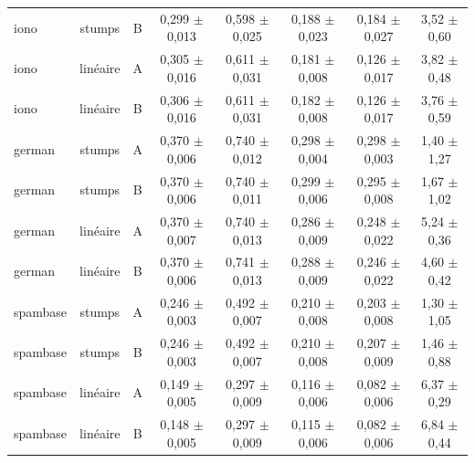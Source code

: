 \begin{table}[tbp]
{\begin{tabular}{lccccccc}
iono & stumps & B & 0,299 $\pm$ 0,013 & 0,598 $\pm$ 0,025 & 0,188 $\pm$ 0,023 & 0,184 $\pm$ 0,027 & 3,52 $\pm$ 0,60 \\
iono & linéaire & A & 0,305 $\pm$ 0,016 & 0,611 $\pm$ 0,031 & 0,181 $\pm$ 0,008 & 0,126 $\pm$ 0,017 & 3,82 $\pm$ 0,48 \\
iono & linéaire & B & 0,306 $\pm$ 0,016 & 0,611 $\pm$ 0,031 & 0,182 $\pm$ 0,008 & 0,126 $\pm$ 0,017 & 3,76 $\pm$ 0,59 \\
german & stumps & A & 0,370 $\pm$ 0,006 & 0,740 $\pm$ 0,012 & 0,298 $\pm$ 0,004 & 0,298 $\pm$ 0,003 & 1,40 $\pm$ 1,27 \\
german & stumps & B & 0,370 $\pm$ 0,006 & 0,740 $\pm$ 0,011 & 0,299 $\pm$ 0,006 & 0,295 $\pm$ 0,008 & 1,67 $\pm$ 1,02 \\
german & linéaire & A & 0,370 $\pm$ 0,007 & 0,740 $\pm$ 0,013 & 0,286 $\pm$ 0,009 & 0,248 $\pm$ 0,022 & 5,24 $\pm$ 0,36 \\
german & linéaire & B & 0,370 $\pm$ 0,006 & 0,741 $\pm$ 0,013 & 0,288 $\pm$ 0,009 & 0,246 $\pm$ 0,022 & 4,60 $\pm$ 0,42 \\
spambase & stumps & A & 0,246 $\pm$ 0,003 & 0,492 $\pm$ 0,007 & 0,210 $\pm$ 0,008 & 0,203 $\pm$ 0,008 & 1,30 $\pm$ 1,05 \\
spambase & stumps & B & 0,246 $\pm$ 0,003 & 0,492 $\pm$ 0,007 & 0,210 $\pm$ 0,008 & 0,207 $\pm$ 0,009 & 1,46 $\pm$ 0,88 \\
spambase & linéaire & A & 0,149 $\pm$ 0,005 & 0,297 $\pm$ 0,009 & 0,116 $\pm$ 0,006 & 0,082 $\pm$ 0,006 & 6,37 $\pm$ 0,29 \\
spambase & linéaire & B & 0,148 $\pm$ 0,005 & 0,297 $\pm$ 0,009 & 0,115 $\pm$ 0,006 & 0,082 $\pm$ 0,006 & 6,84 $\pm$ 0,44 \\
\bottomrule
\end{tabular}
}
\end{table}
